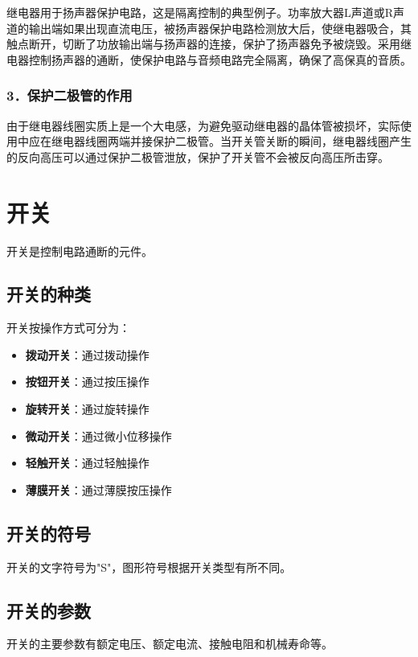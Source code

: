 \documentclass[12pt,UTF8]{ctexbook}
\begin{document}
继电器用于扬声器保护电路，这是隔离控制的典型例子。功率放大器L声道或R声道的输出端如果出现直流电压，被扬声器保护电路检测放大后，使继电器吸合，其触点断开，切断了功放输出端与扬声器的连接，保护了扬声器免予被烧毁。采用继电器控制扬声器的通断，使保护电路与音频电路完全隔离，确保了高保真的音质。

\subsubsection{3．保护二极管的作用}

由于继电器线圈实质上是一个大电感，为避免驱动继电器的晶体管被损坏，实际使用中应在继电器线圈两端并接保护二极管。当开关管关断的瞬间，继电器线圈产生的反向高压可以通过保护二极管泄放，保护了开关管不会被反向高压所击穿。

\section{开关}

开关是控制电路通断的元件。

\subsection{开关的种类}

开关按操作方式可分为：

\begin{itemize}[leftmargin=2cm]
	\item \textbf{拨动开关}：通过拨动操作
	\item \textbf{按钮开关}：通过按压操作
	\item \textbf{旋转开关}：通过旋转操作
	\item \textbf{微动开关}：通过微小位移操作
	\item \textbf{轻触开关}：通过轻触操作
	\item \textbf{薄膜开关}：通过薄膜按压操作
\end{itemize}

\subsection{开关的符号}

开关的文字符号为"S"，图形符号根据开关类型有所不同。

\subsection{开关的参数}

开关的主要参数有额定电压、额定电流、接触电阻和机械寿命等。
\end{document}
